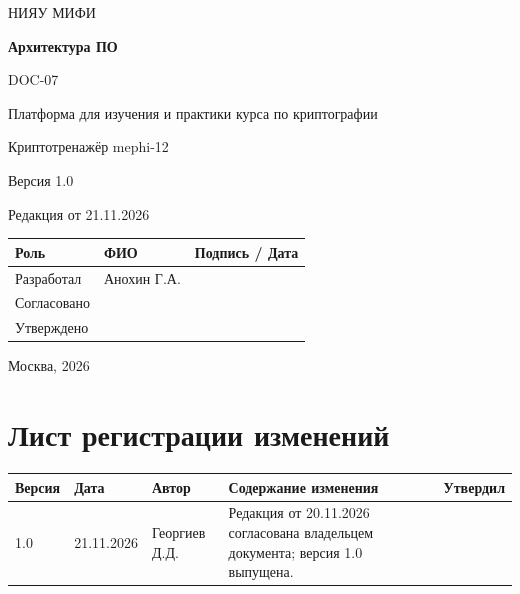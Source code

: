 \documentclass[12pt,a4paper]{article}
\begin{document}
\hypersetup{pageanchor=false}
\begin{titlepage}
  \thispagestyle{empty}
  \centering
  {\large НИЯУ МИФИ\par}
  \vspace*{3.5cm}
  {\LARGE\bfseries Архитектура ПО\par}
  \vspace{0.5cm}
  {\large DOC-07\par}
  \vspace{0.6cm}
  {\large Платформа для изучения и практики курса по криптографии\par}
  {\large Криптотренажёр mephi-12\par}
  \vspace{0.7cm}
  {\large Версия 1.0\par}
  {\large Редакция от 21.11.2026\par}
  \vspace{1cm}
  \begin{tabularx}{\textwidth}{@{}p{3.4cm}Xp{4cm}@{}}
    \toprule
    Роль & ФИО & Подпись / Дата \\
    \midrule
    Разработал & Анохин Г.А. & \\
    \addlinespace[6pt]
    Согласовано & & \\
    \addlinespace[6pt]
    Утверждено & & \\
    \bottomrule
  \end{tabularx}
  \vfill
  {\large Москва, 2026\par}
\end{titlepage}
\hypersetup{pageanchor=true}

\section*{Лист регистрации изменений}
\begingroup\small\singlespacing
\noindent
\begin{tabularx}{\textwidth}{@{}p{1.2cm}p{2cm}p{2.5cm}Xp{1.8cm}@{}}
\toprule
Версия & Дата & Автор & Содержание изменения & Утвердил \\
\midrule
1.0 & 21.11.2026 & Георгиев Д.Д. & Редакция от 20.11.2026 согласована владельцем документа; версия 1.0 выпущена. & \\
\bottomrule
\end{tabularx}
\endgroup
\clearpage
\begingroup\small\singlespacing
\tableofcontents
\endgroup
\clearpage

\hypertarget{doc-07-архитектура-по}{}
\end{document}
